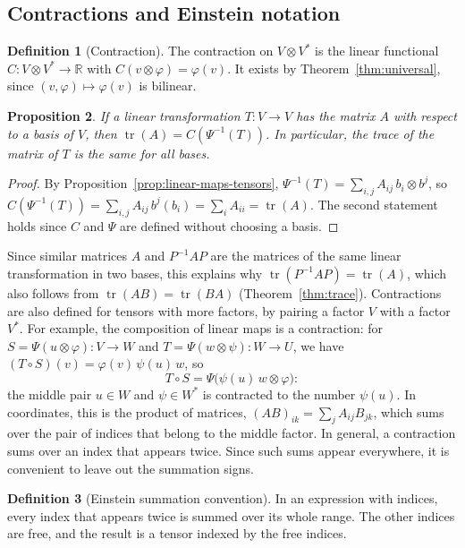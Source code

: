 \documentclass[11pt]{article}
\theoremstyle{definition}
\newtheorem{definition}{Definition}[section]
\theoremstyle{plain}
\newtheorem{proposition}[definition]{Proposition}
\theoremstyle{remark}
\DeclareMathOperator{\tr}{tr}
\begin{document}
\subsection{Contractions and Einstein notation}

\begin{definition}[Contraction]\label{def:contraction}
    The contraction on $V \otimes V^*$ is the linear functional $C: V \otimes V^* \to \mathbb{R}$ with $C(v \otimes \varphi) = \varphi(v)$. It exists by Theorem~\ref{thm:universal}, since $(v, \varphi) \mapsto \varphi(v)$ is bilinear.
\end{definition}

\begin{proposition}\label{prop:trace-contraction}
    If a linear transformation $T: V \to V$ has the matrix $A$ with respect to a basis of $V$, then $\tr(A) = C(\Psi^{-1}(T))$. In particular, the trace of the matrix of $T$ is the same for all bases.
\end{proposition}

\begin{proof}
    By Proposition~\ref{prop:linear-maps-tensors}, $\Psi^{-1}(T) = \sum_{i,j} A_{ij}\, b_i \otimes b^j$, so $C(\Psi^{-1}(T)) = \sum_{i,j} A_{ij}\, b^j(b_i) = \sum_i A_{ii} = \tr(A)$. The second statement holds since $C$ and $\Psi$ are defined without choosing a basis.
\end{proof}

Since similar matrices $A$ and $P^{-1}AP$ are the matrices of the same linear transformation in two bases, this explains why $\tr(P^{-1}AP) = \tr(A)$, which also follows from $\tr(AB) = \tr(BA)$ (Theorem~\ref{thm:trace}). Contractions are also defined for tensors with more factors, by pairing a factor $V$ with a factor $V^*$. For example, the composition of linear maps is a contraction: for $S = \Psi(u \otimes \varphi): V \to W$ and $T = \Psi(w \otimes \psi): W \to U$, we have $(T \circ S)(v) = \varphi(v)\,\psi(u)\,w$, so
\[T \circ S = \Psi\big(\psi(u)\, w \otimes \varphi\big):\]
the middle pair $u \in W$ and $\psi \in W^*$ is contracted to the number $\psi(u)$. In coordinates, this is the product of matrices, $(AB)_{ik} = \sum_j A_{ij}B_{jk}$, which sums over the pair of indices that belong to the middle factor. In general, a contraction sums over an index that appears twice. Since such sums appear everywhere, it is convenient to leave out the summation signs.

\begin{definition}[Einstein summation convention]
    In an expression with indices, every index that appears twice is summed over its whole range. The other indices are free, and the result is a tensor indexed by the free indices.
\end{definition}
\end{document}
